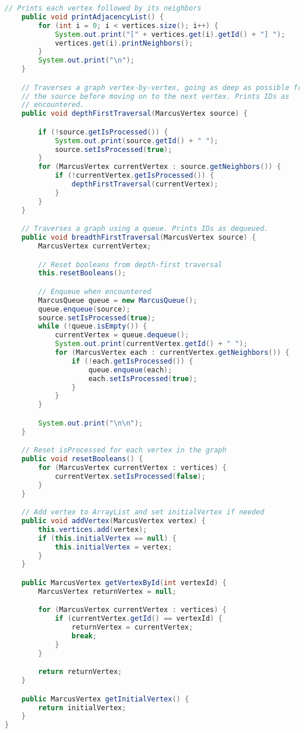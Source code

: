 \documentclass[letterpaper, 10pt]{article}
\begin{document}
\begin{lstlisting}[language=Java, firstnumber=1]
    // Prints each vertex followed by its neighbors
    public void printAdjacencyList() {
        for (int i = 0; i < vertices.size(); i++) {
            System.out.print("[" + vertices.get(i).getId() + "] ");
            vertices.get(i).printNeighbors();
        }
        System.out.print("\n");
    }

    // Traverses a graph vertex-by-vertex, going as deep as possible from
    // the source before moving on to the next vertex. Prints IDs as
    // encountered.
    public void depthFirstTraversal(MarcusVertex source) {

        if (!source.getIsProcessed()) {
            System.out.print(source.getId() + " ");
            source.setIsProcessed(true);
        }
        for (MarcusVertex currentVertex : source.getNeighbors()) {
            if (!currentVertex.getIsProcessed()) {
                depthFirstTraversal(currentVertex);
            }
        }
    }

    // Traverses a graph using a queue. Prints IDs as dequeued.
    public void breadthFirstTraversal(MarcusVertex source) {
        MarcusVertex currentVertex;

        // Reset booleans from depth-first traversal
        this.resetBooleans();

        // Enqueue when encountered
        MarcusQueue queue = new MarcusQueue();
        queue.enqueue(source);
        source.setIsProcessed(true);
        while (!queue.isEmpty()) {
            currentVertex = queue.dequeue();
            System.out.print(currentVertex.getId() + " ");
            for (MarcusVertex each : currentVertex.getNeighbors()) {
                if (!each.getIsProcessed()) {
                    queue.enqueue(each);
                    each.setIsProcessed(true);
                }
            }
        }

        System.out.print("\n\n");
    }

    // Reset isProcessed for each vertex in the graph
    public void resetBooleans() {
        for (MarcusVertex currentVertex : vertices) {
            currentVertex.setIsProcessed(false);
        }
    }

    // Add vertex to ArrayList and set initialVertex if needed
    public void addVertex(MarcusVertex vertex) {
        this.vertices.add(vertex);
        if (this.initialVertex == null) {
            this.initialVertex = vertex;
        }
    }

    public MarcusVertex getVertexById(int vertexId) {
        MarcusVertex returnVertex = null;

        for (MarcusVertex currentVertex : vertices) {
            if (currentVertex.getId() == vertexId) {
                returnVertex = currentVertex;
                break;
            }
        }

        return returnVertex;
    }

    public MarcusVertex getInitialVertex() {
        return initialVertex;
    }
}

\end{lstlisting}
\end{document}

